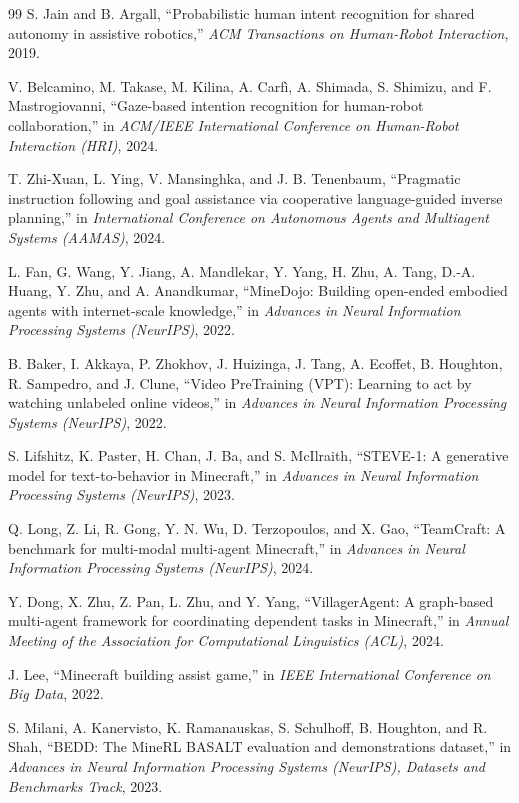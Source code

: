 \documentclass[12pt]{article}
\begin{document}
\begin{thebibliography}{99}
 S. Jain and B. Argall, ``Probabilistic human intent recognition
for shared autonomy in assistive robotics,'' \emph{ACM Transactions on
Human-Robot Interaction}, 2019.

 V. Belcamino, M. Takase, M. Kilina, A. Carf\`i, A. Shimada,
S. Shimizu, and F. Mastrogiovanni, ``Gaze-based intention recognition for
human-robot collaboration,'' in \emph{ACM/IEEE International Conference on
Human-Robot Interaction (HRI)}, 2024.

 T. Zhi-Xuan, L. Ying, V. Mansinghka, and J. B. Tenenbaum,
``Pragmatic instruction following and goal assistance via cooperative
language-guided inverse planning,'' in \emph{International Conference on
Autonomous Agents and Multiagent Systems (AAMAS)}, 2024.

 L. Fan, G. Wang, Y. Jiang, A. Mandlekar, Y. Yang, H. Zhu,
A. Tang, D.-A. Huang, Y. Zhu, and A. Anandkumar, ``MineDojo: Building
open-ended embodied agents with internet-scale knowledge,'' in \emph{Advances
in Neural Information Processing Systems (NeurIPS)}, 2022.

 B. Baker, I. Akkaya, P. Zhokhov, J. Huizinga, J. Tang,
A. Ecoffet, B. Houghton, R. Sampedro, and J. Clune, ``Video PreTraining (VPT):
Learning to act by watching unlabeled online videos,'' in \emph{Advances in
Neural Information Processing Systems (NeurIPS)}, 2022.

 S. Lifshitz, K. Paster, H. Chan, J. Ba, and S. McIlraith,
``STEVE-1: A generative model for text-to-behavior in Minecraft,'' in
\emph{Advances in Neural Information Processing Systems (NeurIPS)}, 2023.

 Q. Long, Z. Li, R. Gong, Y. N. Wu, D. Terzopoulos, and
X. Gao, ``TeamCraft: A benchmark for multi-modal multi-agent Minecraft,'' in
\emph{Advances in Neural Information Processing Systems (NeurIPS)}, 2024.

 Y. Dong, X. Zhu, Z. Pan, L. Zhu, and Y. Yang,
``VillagerAgent: A graph-based multi-agent framework for coordinating dependent
tasks in Minecraft,'' in \emph{Annual Meeting of the Association for
Computational Linguistics (ACL)}, 2024.

 J. Lee, ``Minecraft building assist game,'' in \emph{IEEE
International Conference on Big Data}, 2022.

 S. Milani, A. Kanervisto, K. Ramanauskas, S. Schulhoff,
B. Houghton, and R. Shah, ``BEDD: The MineRL BASALT evaluation and
demonstrations dataset,'' in \emph{Advances in Neural Information Processing
Systems (NeurIPS), Datasets and Benchmarks Track}, 2023.


\end{thebibliography}
\end{document}
